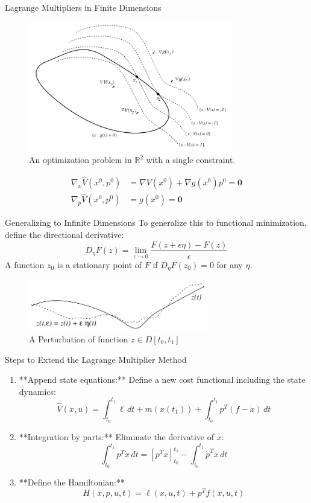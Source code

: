 \documentclass[10pt]{beamer}
\begin{document}
\begin{frame}{Lagrange Multipliers in Finite Dimensions}
  \begin{figure}
      \centering
      \includegraphics[width=0.8\textwidth]{photos/1.png}
      \caption{An optimization problem in \( \mathbb{R}^2 \) with a single constraint.}
  \end{figure}
  \[
    \begin{aligned}
      \nabla_x \hat{V}(x^0, p^0) &= \nabla V(x^0) + \nabla g(x^0) p^0 = \mathbf{0}\\
      \nabla_p \hat{V}(x^0, p^0) &= g(x^0) = \mathbf{0}
    \end{aligned}
  \]
\end{frame}  

\begin{frame}{Generalizing to Infinite Dimensions}
  To generalize this to functional minimization, define the directional derivative:
  \[
  D_\eta F(z) = \lim_{\epsilon \to 0} \frac{F(z + \epsilon \eta) - F(z)}{\epsilon}
  \]
  A function \( z_0 \) is a stationary point of \( F \) if \( D_\eta F(z_0) = 0 \) for any \( \eta \).
  \begin{figure}
    \centering
    \includegraphics[width=0.7\textwidth]{photos/2.png}
    \caption{A Perturbation of function \(z\in D[t_{0},t_{1}]\)}
  \end{figure}
\end{frame}

\begin{frame}{Steps to Extend the Lagrange Multiplier Method}
\begin{enumerate}
    \item **Append state equations:** Define a new cost functional including the state dynamics:
    \[
    \hat{V}(x, u) = \int_{t_0}^{t_1} \ell \, dt + m(x(t_1)) + \int_{t_0}^{t_1} p^T (f - \dot{x}) \, dt
    \]
    \item **Integration by parts:** Eliminate the derivative of \( x \):
    \[
    \int_{t_0}^{t_1} p^T \dot{x} \, dt = \left[ p^T x \right]_{t_0}^{t_1} - \int_{t_0}^{t_1} \dot{p}^T x \, dt
    \]
    \item **Define the Hamiltonian:**
    \[
    H(x, p, u, t) = \ell(x, u, t) + p^T f(x, u, t)
    \]
\end{enumerate}
\end{frame}
\end{document}

